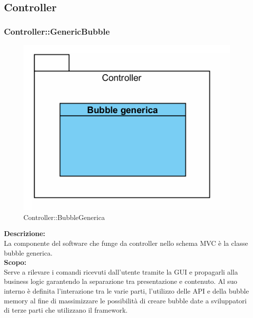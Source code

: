 \subsection{Controller}
\begin{samepage}
\subsubsection{Controller\-::Generic\-Bubble}\label{fm-generica}
\begin{figure}[H]
	\centering
	\includegraphics[width=14cm]{diagrammi_img/classi_e_package/bubble_generica.png}
	\caption{Controller\-::BubbleGenerica}
\end{figure}
\end{samepage}
\textbf{Descrizione:}\\
La componente del software che funge da controller nello schema MVC è la classe bubble generica.\\
\textbf{Scopo:}\\
Serve a rilevare i comandi ricevuti dall'utente tramite la GUI e propagarli alla business logic garantendo la separazione tra presentazione e contenuto. Al suo interno è definita l'interazione tra le varie parti, l'utilizzo delle API e della bubble memory al fine di massimizzare le possibilità di creare bubble date a sviluppatori di terze parti che utilizzano il framework.

